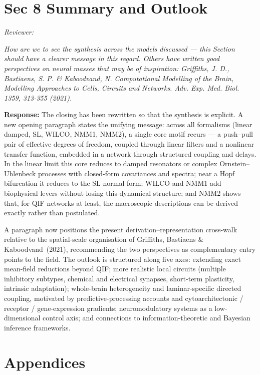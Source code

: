 \documentclass[12pt,a4paper]{article}
\newcommand{\reviewercomment}[1]{\par\smallskip\noindent\textit{Reviewer:}\par\smallskip\begingroup\itshape #1\par\endgroup\smallskip}
\newcommand{\ourresponse}[1]{\par\noindent\textbf{Response:} #1\par\medskip}
\begin{document}
\section*{Sec 8 Summary and Outlook}

\reviewercomment{How are we to see the synthesis across the models discussed --- this Section should have a clearer message in this regard. Others have written good perspectives on neural masses that may be of inspiration: Griffiths, J. D., Bastiaens, S. P. \& Kaboodvand, N. Computational Modelling of the Brain, Modelling Approaches to Cells, Circuits and Networks. Adv. Exp. Med. Biol. 1359, 313-355 (2021).}

\ourresponse{The closing has been rewritten so that the synthesis is explicit. A new opening paragraph states the unifying message: across all formalisms (linear damped, SL, WILCO, NMM1, NMM2), a single core motif recurs --- a push--pull pair of effective degrees of freedom, coupled through linear filters and a nonlinear transfer function, embedded in a network through structured coupling and delays. In the linear limit this core reduces to damped resonators or complex Ornstein--Uhlenbeck processes with closed-form covariances and spectra; near a Hopf bifurcation it reduces to the SL normal form; WILCO and NMM1 add biophysical levers without losing this dynamical structure; and NMM2 shows that, for QIF networks at least, the macroscopic descriptions can be derived exactly rather than postulated.

A paragraph now positions the present derivation--representation cross-walk relative to the spatial-scale organisation of Griffiths, Bastiaens \& Kaboodvand~(2021), recommending the two perspectives as complementary entry points to the field. The outlook is structured along five axes: extending exact mean-field reductions beyond QIF; more realistic local circuits (multiple inhibitory subtypes, chemical and electrical synapses, short-term plasticity, intrinsic adaptation); whole-brain heterogeneity and laminar-specific directed coupling, motivated by predictive-processing accounts and cytoarchitectonic / receptor / gene-expression gradients; neuromodulatory systems as a low-dimensional control axis; and connections to information-theoretic and Bayesian inference frameworks.}

\section*{Appendices}
\end{document}
